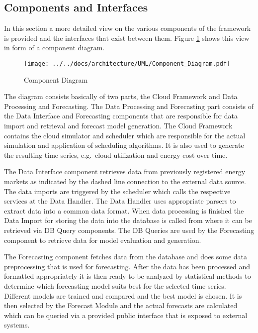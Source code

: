 \subsection{Components and Interfaces}

In this section a more detailed view on the various components of the framework is provided and the interfaces that exist between them. Figure \ref{fig:Component_Diagram} shows this view in form of a component diagram. 

\begin{figure}[htbp]
	\hspace*{-0.4in}
		\texttt{[image: ../../docs/architecture/UML/Component\_Diagram.pdf]}
	\caption{Component Diagram}
	\label{fig:Component_Diagram}
\end{figure}

The diagram consists basically of two parts, the Cloud Framework and Data Processing and Forecasting. The Data Processing and Forecasting part consists of the Data Interface and Forecasting components that are responsible for data import and retrieval and forecast model generation. The Cloud Framework contains the cloud simulator and scheduler which are responsible for the actual simulation and application of scheduling algorithms. It is also used to generate the resulting time series, e.g.~cloud utilization and energy cost over time. 

The Data Interface component retrieves data from previously registered energy markets as indicated by the dashed line connection to the external data source. The data imports are triggered by the scheduler which calls the respective services at the Data Handler. The Data Handler uses appropriate parsers to extract data into a common data format. When data processing is finished the Data Import for storing the data into the database is called from where it can be retrieved via DB Query components. The DB Queries are used by the Forecasting component to retrieve data for model evaluation and generation. 

The Forecasting component fetches data from the database and does some data preprocessing that is used for forecasting. After the data has been processed and formatted appropriately it is then ready to be analyzed by statistical methods to determine which forecasting model suits best for the selected time series. Different models are trained and compared and the best model is chosen. It is then selected by the Forecast Module and the actual forecasts are calculated which can be queried via a provided public interface that is exposed to external systems. 

